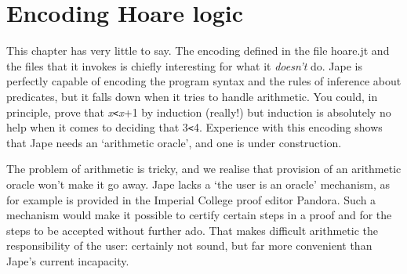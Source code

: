 \chapter{Encoding Hoare logic}
\label{chap:Hoare}

This chapter has very little to say. The encoding defined in the file hoare.jt and the files that it invokes is chiefly interesting for what it \textit{doesn't} do. Jape is perfectly capable of encoding the program syntax and the rules of inference about predicates, but it falls down when it tries to handle arithmetic. You could, in principle, prove that \textit{x}\texttt{<}\textit{x}+1 by induction (really!) but induction is absolutely no help when it comes to deciding that 3\texttt{<}4. Experience with this encoding shows that Jape needs an `arithmetic oracle', and one is under construction.


The problem of arithmetic is tricky, and we realise that provision of an arithmetic oracle won't make it go away. Jape lacks a `the user is an oracle' mechanism, as for example is provided in the Imperial College proof editor Pandora. Such a mechanism would make it possible to certify certain steps in a proof and for the steps to be accepted without further ado. That makes difficult arithmetic the responsibility of the user: certainly not sound, but far more convenient than Jape's current incapacity.\\
 